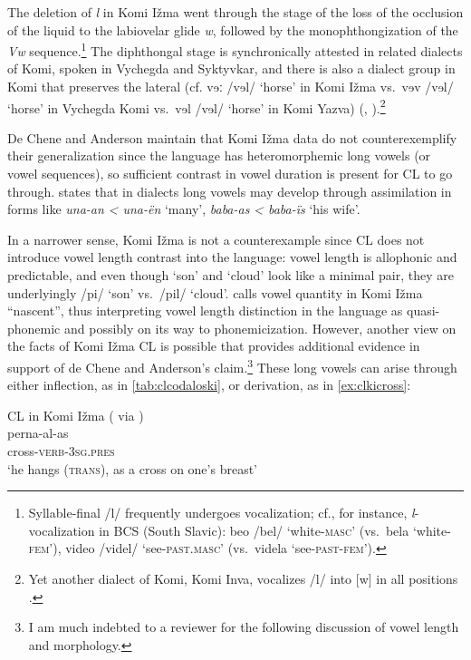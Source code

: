 \documentclass[output=paper,
modfonts
]{LSP/langsci}
\begin{document}
The deletion of \emph{l} in Komi Ižma went through the stage of the loss
of the occlusion of the liquid to the labiovelar glide \emph{w},
followed by the monophthongization of the \emph{Vw} sequence.\footnote{Syllable-final
  /l/ frequently undergoes vocalization; cf., for instance,
  \emph{l}-vocalization in BCS (South Slavic): beo /bel/
  `white-\textsc{masc'} (vs.\ bela `white-\textsc{fem'}), video /videl/
  `see-\textsc{past.masc}' (vs.\ videla `see-\textsc{past-fem}').} The
diphthongal stage is synchronically attested in related dialects of
Komi, spoken in Vychegda and Syktyvkar, and there is also a dialect
group in Komi that preserves the lateral (cf. vɘː /vɘl/ `horse' in Komi
Ižma vs.\ vɘv /vɘl/ `horse' in Vychegda Komi vs.\ vɘl /vɘl/ `horse' in
Komi Yazva) (\citealt[44--49]{lytkin1966}, \citealt[106--115]{lytkin1976}).\footnote{Yet another dialect of Komi, Komi Inva,
  vocalizes /l/ into {[}w{]} in all positions \citep[44--49]{lytkin1966}.}

De Chene and Anderson \citeyearpar{deChene1979} maintain that Komi Ižma data do not
counterexemplify their generalization since the language has
heteromorphemic long vowels (or vowel sequences), so sufficient contrast
in vowel duration is present for CL to go through. \citet[309]{hausenberg1998} states that in dialects long vowels may develop through
assimilation in forms like \emph{una-an} \emph{\textless{} una-ën}
`many', \emph{baba-as} \emph{\textless{} baba-ïs} `his wife'.

In a narrower sense, Komi Ižma is not a counterexample since CL does not
introduce vowel length contrast into the language: vowel length is
allophonic and predictable, and even though `son' and `cloud' look like
a minimal pair, they are underlyingly /pi/ `son' vs.\ /pil/ `cloud'.
\citet[13]{abondolo1998} calls vowel quantity in Komi Ižma ``nascent'', thus
interpreting vowel length distinction in the language as quasi-phonemic
and possibly on its way to phonemicization. However, another view on the
facts of Komi Ižma CL is possible that provides additional evidence in
support of de Chene and Anderson's claim.\footnote{I am much indebted to
  a reviewer for the following discussion of vowel length and
  morphology.} These long vowels can arise through either inflection, as
in \cref{tab:clcodaloski}, or derivation, as in ‎\cref{ex:clkicross}:

\ea\label{ex:clkicross}CL in Komi Ižma (\citealt[309]{collinder1957} via \citealt[525]{deChene1979})\\
		\gll perna-al-as \\
		cross-\textsc{verb-3sg.pres}\\
		\glt `he hangs (\textsc{trans}), as a cross on one's breast'
\z
\end{document}
